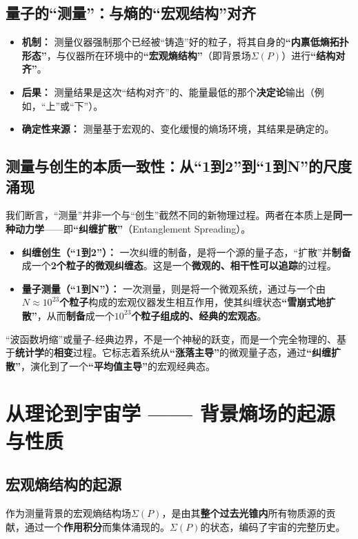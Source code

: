 \documentclass[12pt]{article}
\begin{document}
\subsection{量子的``测量''：与熵的``宏观结构''对齐}
\begin{itemize}
    \item   \textbf{机制：} 测量仪器强制那个已经被``铸造''好的粒子，将其自身的\textbf{``内禀低熵拓扑形态''}，与仪器所在环境中的\textbf{``宏观熵结构''}（即背景场$\Sigma(P)$）进行\textbf{``结构对齐''}。
    \item   \textbf{后果：} 测量结果是这次``结构对齐''的、能量最低的那个\textbf{决定论}输出（例如，``上''或``下''）。
    \item   \textbf{确定性来源：} 测量基于宏观的、变化缓慢的熵场环境，其结果是确定的。
\end{itemize}

\subsection{测量与创生的本质一致性：从``1到2''到``1到N''的尺度涌现}
我们断言，``测量''并非一个与``创生''截然不同的新物理过程。两者在本质上是\textbf{同一种动力学}——即\textbf{``纠缠扩散''}（Entanglement Spreading）。

\begin{itemize}
    \item   \textbf{纠缠创生（``1到2''）：} 一次纠缠的制备，是将一个源的量子态，``扩散''并\textbf{制备}成一个\textbf{2个粒子的微观纠缠态}。这是一个\textbf{微观的、相干性可以追踪}的过程。
    \item   \textbf{量子测量（``1到N''）：} 一次测量，则是将一个微观系统，通过与一个由\textbf{$N \approx 10^{23}$个粒子}构成的宏观仪器发生相互作用，使其纠缠状态\textbf{``雪崩式地扩散''}，从而\textbf{制备}成一个\textbf{$10^{23}$个粒子组成的、经典的宏观态}。
\end{itemize}

\noindent ``波函数坍缩''或量子-经典边界，不是一个神秘的跃变，而是一个完全物理的、基于\textbf{统计学}的\textbf{相变}过程。它标志着系统从\textbf{``涨落主导''}的微观量子态，通过\textbf{``纠缠扩散''}，演化到了一个\textbf{``平均值主导''}的宏观经典态。



\section{从理论到宇宙学 —— 背景熵场的起源与性质}

\subsection{宏观熵结构的起源}
作为测量背景的宏观熵结构场$\Sigma(P)$，是由其\textbf{整个过去光锥内}所有物质源的贡献，通过一个\textbf{作用积分}而集体涌现的。$\Sigma(P)$的状态，编码了宇宙的完整历史。
\end{document}
